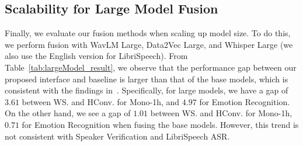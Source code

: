 \subsection{Scalability for Large Model Fusion}
Finally, we evaluate our fusion methods when scaling up model size.
To do this, we perform fusion with WavLM Large, Data2Vec Large, and Whisper Large (we also use the English version for LibriSpeech).
From Table~\ref{tab:largeModel_result}, we observe that the performance gap between our proposed interface and baseline is larger than that of the base models, which is consistent with the findings in~\cite{shih24_interface}.
Specifically, for large models, we have a gap of $3.61$  between WS. and HConv. for Mono-1h, and $4.97$ for Emotion Recognition.
On the other hand, we see a gap of $1.01$ between WS. and HConv. for Mono-1h, $0.71$ for Emotion Recognition when fusing the base models.
However, this trend is not consistent with Speaker Verification and LibriSpeech ASR.



